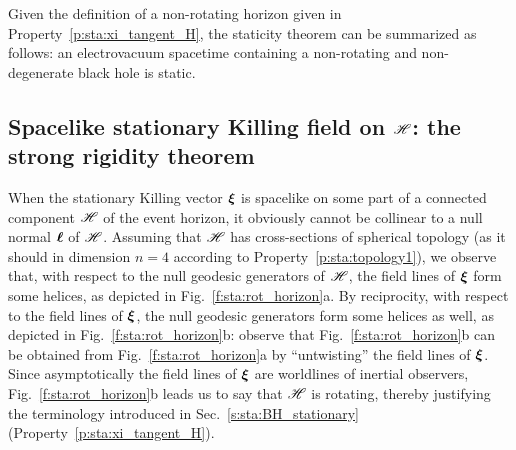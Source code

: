 \begin{remark}
Given the definition of a non-rotating horizon given in Property~\ref{p:sta:xi_tangent_H},
the staticity theorem can be summarized as follows:
an electrovacuum spacetime containing a non-rotating and non-degenerate black hole is static.
\end{remark}

\subsection{Spacelike stationary Killing field on $\mathscr{H}$: the strong rigidity theorem}
\label{s:sta:strong_rigidity}

When the stationary Killing vector $\bm{\xi}$ is spacelike
on some part of a connected component $\mathscr{H}$ of the event horizon, it obviously cannot be collinear to
a null normal $\bm{\ell}$ of $\mathscr{H}$.
Assuming that $\mathscr{H}$ has cross-sections of spherical topology (as it should
in dimension $n=4$ according to Property~\ref{p:sta:topology1}), we observe
that, with respect to the null geodesic generators of $\mathscr{H}$, the field lines of $\bm{\xi}$
form some helices, as depicted in Fig.~\ref{f:sta:rot_horizon}a. By reciprocity,
with respect to the field lines of $\bm{\xi}$,
the null geodesic generators form some helices as well, as depicted in
Fig.~\ref{f:sta:rot_horizon}b:
observe that Fig.~\ref{f:sta:rot_horizon}b can be obtained from Fig.~\ref{f:sta:rot_horizon}a
by ``untwisting'' the field lines of $\bm{\xi}$.
Since asymptotically the field lines of $\bm{\xi}$ are worldlines of inertial observers,
Fig.~\ref{f:sta:rot_horizon}b leads us to say
that $\mathscr{H}$ is rotating, thereby justifying the terminology introduced
in Sec.~\ref{s:sta:BH_stationary} (Property~\ref{p:sta:xi_tangent_H}).


